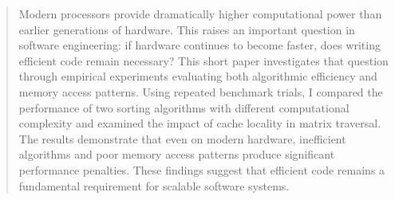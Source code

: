 \begin{abstract}
Modern processors provide dramatically higher computational power than earlier generations of hardware. This raises an important question in software engineering: if hardware continues to become faster, does writing efficient code remain necessary? This short paper investigates that question through empirical experiments evaluating both algorithmic efficiency and memory access patterns. Using repeated benchmark trials, I compared the performance of two sorting algorithms with different computational complexity and examined the impact of cache locality in matrix traversal. The results demonstrate that even on modern hardware, inefficient algorithms and poor memory access patterns produce significant performance penalties. These findings suggest that efficient code remains a fundamental requirement for scalable software systems.
\end{abstract}
